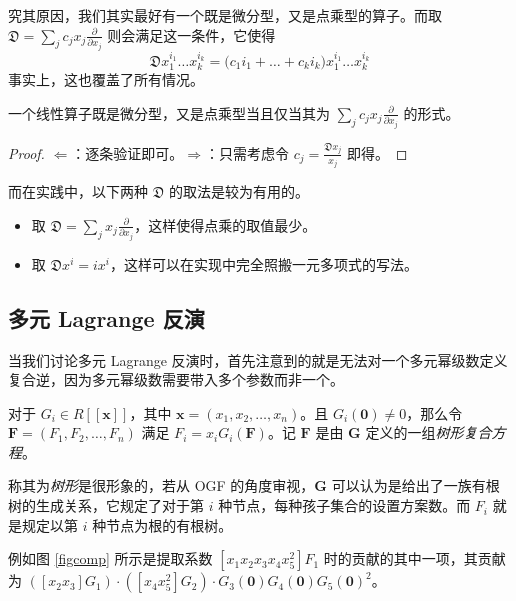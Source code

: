 究其原因，我们其实最好有一个既是微分型，又是点乘型的算子。而取 $\mathfrak D=\sum_j c_j x_j\frac{\partial}{\partial x_j}$ 则会满足这一条件，它使得
$$
\mathfrak D x_1^{i_1}\dots x_k^{i_k} = \mathfrak (c_1i_1+\dots+c_ki_k)x_1^{i_1}\dots x_k^{i_k}
$$
事实上，这也覆盖了所有情况。
\begin{lemma}
一个线性算子既是微分型，又是点乘型当且仅当其为 $\sum_j c_j x_j\frac{\partial}{\partial x_j}$ 的形式。
\end{lemma}
\begin{proof}
$\Leftarrow$：逐条验证即可。$\Rightarrow$：只需考虑令 $c_j = \frac{\mathfrak D x_j}{x_j}$ 即得。
\end{proof}
而在实践中，以下两种 $\mathfrak D$ 的取法是较为有用的。
\begin{itemize}
\item 取 $\mathfrak D=\sum_j x_j\frac{\partial}{\partial x_j}$，这样使得点乘的取值最少。
\item 取 $\mathfrak D x^i = ix^i$，这样可以在实现中完全照搬一元多项式的写法。
\end{itemize}

\subsection{多元 Lagrange 反演}

当我们讨论多元 Lagrange 反演时，首先注意到的就是无法对一个多元幂级数定义复合逆，因为多元幂级数需要带入多个参数而非一个。

\begin{definition}[树形复合方程]
对于 $G_i \in R[[\mathbf x]]$，其中 $\mathbf x = (x_1, x_2, \dots, x_n)$。且 $G_i(\mathbf 0) \neq 0$，那么令 $\mathbf F = (F_1, F_2, \dots, F_n)$ 满足 $F_i = x_i G_i (\mathbf F)$。记 $\mathbf F$ 是由 $\mathbf G$ 定义的一组\emph{树形复合方程}。
\end{definition}

称其为\emph{树形}是很形象的，若从 OGF 的角度审视，$\mathbf G$ 可以认为是给出了一族有根树的生成关系，它规定了对于第 $i$ 种节点，每种孩子集合的设置方案数。而 $F_i$ 就是规定以第 $i$ 种节点为根的有根树。

例如图 \ref{figcomp} 所示是提取系数 $[x_1x_2x_3x_4x_5^2]F_1$ 时的贡献的其中一项，其贡献为 $([x_2x_3]G_1) \cdot ([x_4x_5^2]G_2) \cdot G_3(\mathbf 0)G_4(\mathbf 0)G_5(\mathbf 0)^2$。

